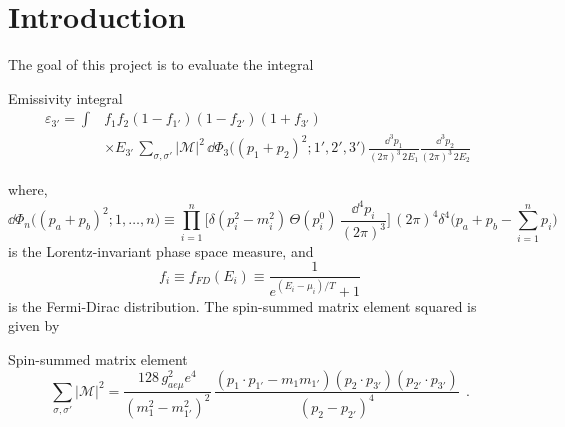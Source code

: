 \section{Introduction}
\label{sec:introduction}
The goal of this project is to evaluate the integral 

\begin{bluenv}{Emissivity integral}
    \begin{equation}
    \label{eq:emissivity-integral}
    \begin{aligned}
        \varepsilon_{3'} = \int 
            & f_1 f_2 (1 - f_{1'}) (1 - f_{2'}) (1 + f_{3'}) \\
            &\times E_{3'} \,
            \sum_{\sigma, \sigma'} | \mathcal{M} |^2 \,
            \dd \Phi_3 \big( (p_1 + p_2)^2; 1', 2', 3'\big)
            \,
            \frac{\dd^3 p_1}{(2\pi)^3\,2 E_1}
            \frac{\dd^3 p_2}{(2\pi)^3\,2 E_2} 
            \; 
    \end{aligned}
    \end{equation}
\end{bluenv}
where, 
\begin{equation}
    \label{eq:LIPS}
    \dd \Phi_n \big((p_a + p_b)^2; 1, \ldots, n \big) \equiv 
    \prod_{i=1}^{n}
    \bigg[
         \delta (p_i^2 - m_i^2) \, \Theta(p_i^0) \, 
        \frac{\dd^4 p_i}{(2\pi)^3}
    \bigg] \, (2\pi)^4 \delta^4 
    \bigg( 
        p_a + p_b - \sum_{i=1}^{n} p_i
    \bigg) \quad 
\end{equation}
is the Lorentz-invariant phase space measure, and
\begin{equation*}
    f_i \equiv f_{FD}(E_i) \equiv \frac{1}{e^{(E_i - \mu_i)/T} + 1}
\end{equation*}
is the Fermi-Dirac distribution. 
The spin-summed matrix element squared is given by
\begin{bluenv}{Spin-summed matrix element}
    \begin{equation}
        \label{eq:matrix-element}
        \sum_{\sigma, \sigma'} | \mathcal{M} |^2 
            = 
            \frac{128 \, g^2_{ae\mu} e^4}{(m_1^2 - m_{1'}^2)^2} \,
            \frac{
                 (p_1 \cdot p_{1'} - m_1 m_{1'})
                (p_2 \cdot p_{3'})
                (p_{2'} \cdot p_{3'})
            }
            {
                (p_2 - p_{2'})^4
            } \; \, .
    \end{equation}
\end{bluenv}


